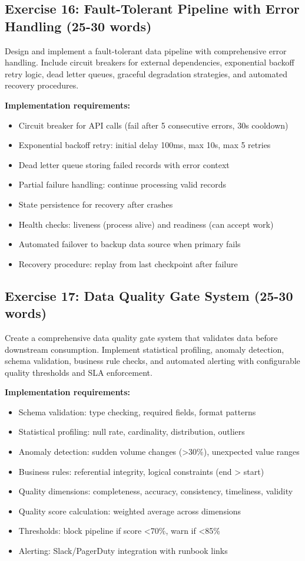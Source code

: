 \subsection{Exercise 16: Fault-Tolerant Pipeline with Error Handling (25-30 words)}

Design and implement a fault-tolerant data pipeline with comprehensive error handling. Include circuit breakers for external dependencies, exponential backoff retry logic, dead letter queues, graceful degradation strategies, and automated recovery procedures.

\textbf{Implementation requirements:}
\begin{itemize}
    \item Circuit breaker for API calls (fail after 5 consecutive errors, 30s cooldown)
    \item Exponential backoff retry: initial delay 100ms, max 10s, max 5 retries
    \item Dead letter queue storing failed records with error context
    \item Partial failure handling: continue processing valid records
    \item State persistence for recovery after crashes
    \item Health checks: liveness (process alive) and readiness (can accept work)
    \item Automated failover to backup data source when primary fails
    \item Recovery procedure: replay from last checkpoint after failure
\end{itemize}

\subsection{Exercise 17: Data Quality Gate System (25-30 words)}

Create a comprehensive data quality gate system that validates data before downstream consumption. Implement statistical profiling, anomaly detection, schema validation, business rule checks, and automated alerting with configurable quality thresholds and SLA enforcement.

\textbf{Implementation requirements:}
\begin{itemize}
    \item Schema validation: type checking, required fields, format patterns
    \item Statistical profiling: null rate, cardinality, distribution, outliers
    \item Anomaly detection: sudden volume changes (>30\%), unexpected value ranges
    \item Business rules: referential integrity, logical constraints (end > start)
    \item Quality dimensions: completeness, accuracy, consistency, timeliness, validity
    \item Quality score calculation: weighted average across dimensions
    \item Thresholds: block pipeline if score <70\%, warn if <85\%
    \item Alerting: Slack/PagerDuty integration with runbook links
\end{itemize}

